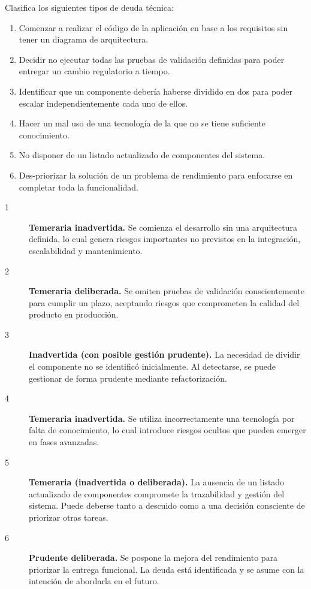 

\begin{enunciado}
    Clasifica los siguientes tipos de deuda técnica:
    \begin{enumerate}
        \item Comenzar a realizar el código de la aplicación en base a los requisitos sin tener un diagrama de arquitectura.
        \item Decidir no ejecutar todas las pruebas de validación definidas para poder entregar un cambio regulatorio a tiempo.
        \item Identificar que un componente debería haberse dividido en dos para poder escalar independientemente cada uno de ellos.
        \item Hacer un mal uso de una tecnología de la que no se tiene suficiente conocimiento.
        \item No disponer de un listado actualizado de componentes del sistema.
        \item Des-priorizar la solución de un problema de rendimiento para enfocarse en completar toda la funcionalidad.
    \end{enumerate}
\end{enunciado}
\begin{solucion}
    \begin{description}
        \item[1] \textbf{Temeraria inadvertida.}
        Se comienza el desarrollo sin una arquitectura definida, lo cual genera riesgos importantes no previstos en la integración, escalabilidad y mantenimiento.

        \item[2] \textbf{Temeraria deliberada.}
        Se omiten pruebas de validación conscientemente para cumplir un plazo, aceptando riesgos que comprometen la calidad del producto en producción.

        \item[3] \textbf{Inadvertida (con posible gestión prudente).}
        La necesidad de dividir el componente no se identificó inicialmente.
        Al detectarse, se puede gestionar de forma prudente mediante refactorización.

        \item[4] \textbf{Temeraria inadvertida.}
        Se utiliza incorrectamente una tecnología por falta de conocimiento, lo cual introduce riesgos ocultos que pueden emerger en fases avanzadas.

        \item[5] \textbf{Temeraria (inadvertida o deliberada).}
        La ausencia de un listado actualizado de componentes compromete la trazabilidad y gestión del sistema.
        Puede deberse tanto a descuido como a una decisión consciente de priorizar otras tareas.

        \item[6] \textbf{Prudente deliberada.}
        Se pospone la mejora del rendimiento para priorizar la entrega funcional.
        La deuda está identificada y se asume con la intención de abordarla en el futuro.
    \end{description}
\end{solucion}
